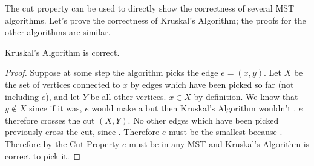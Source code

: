 \documentclass{tufte-handout}
\begin{document}
The cut property can be used to directly show the correctness of
several MST algorithms.  Let's prove the correctness of Kruskal's
Algorithm; the proofs for the other algorithms are similar.

\begin{thm}
  Kruskal's Algorithm is correct.
\end{thm}

\begin{proof}
  Suppose at some step the algorithm picks the edge $e = (x,y)$.  Let
  $X$ be the set of vertices connected to $x$ by edges which have been
  picked so far (not including $e$), and let $Y$ be all other
  vertices. $x \in X$ by definition.  We know that $y \notin X$ since
  if it was, $e$ would make a  but then Kruskal's
  Algorithm wouldn't . $e$ therefore crosses
  the cut $(X,Y)$. No other edges which have been picked previously
  cross the cut, since . Therefore $e$ must be the smallest
   because . Therefore by
  the Cut Property $e$ must be in any MST and Kruskal's Algorithm is
  correct to pick it.
\end{proof}
\end{document}
